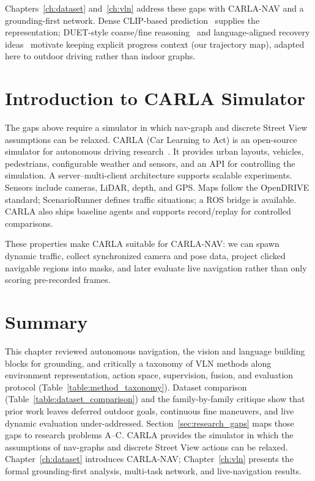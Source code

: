 Chapters~\ref{ch:dataset} and~\ref{ch:vln} address these gaps with CARLA-NAV and a grounding-first network. Dense CLIP-based prediction~\cite{Rao_Zhao_Chen_Tang_Zhu_Huang_Zhou_Lu_2022,luddecke2022clipseg} supplies the representation; DUET-style coarse/fine reasoning~\cite{chen2022think} and language-aligned recovery ideas~\cite{Raychaudhuri2021Language} motivate keeping explicit progress context (our trajectory map), adapted here to outdoor driving rather than indoor graphs.

\section{Introduction to CARLA Simulator}

The gaps above require a simulator in which nav-graph and discrete Street View assumptions can be relaxed. CARLA (Car Learning to Act) is an open-source simulator for autonomous driving research~\cite{dosovitskiy2017carla}. It provides urban layouts, vehicles, pedestrians, configurable weather and sensors, and an API for controlling the simulation. A server--multi-client architecture supports scalable experiments. Sensors include cameras, LiDAR, depth, and GPS. Maps follow the OpenDRIVE standard; ScenarioRunner defines traffic situations; a ROS bridge is available. CARLA also ships baseline agents and supports record/replay for controlled comparisons.

These properties make CARLA suitable for CARLA-NAV: we can spawn dynamic traffic, collect synchronized camera and pose data, project clicked navigable regions into masks, and later evaluate live navigation rather than only scoring pre-recorded frames.

\section{Summary}

This chapter reviewed autonomous navigation, the vision and language building blocks for grounding, and critically a taxonomy of VLN methods along environment representation, action space, supervision, fusion, and evaluation protocol (Table~\ref{table:method_taxonomy}). Dataset comparison (Table~\ref{table:dataset_comparison}) and the family-by-family critique show that prior work leaves deferred outdoor goals, continuous fine maneuvers, and live dynamic evaluation under-addressed. Section~\ref{sec:research_gaps} maps those gaps to research problems A--C. CARLA provides the simulator in which the assumptions of nav-graphs and discrete Street View actions can be relaxed. Chapter~\ref{ch:dataset} introduces CARLA-NAV; Chapter~\ref{ch:vln} presents the formal grounding-first analysis, multi-task network, and live-navigation results.
